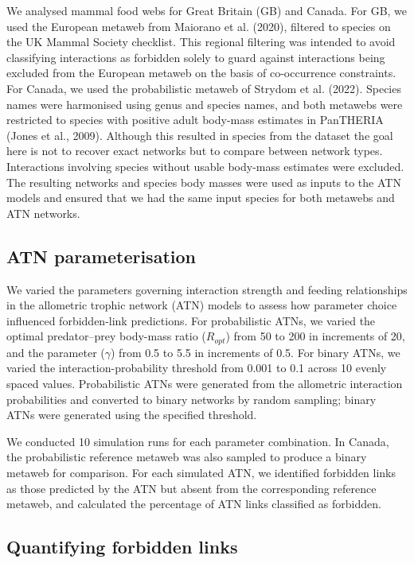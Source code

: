 \documentclass[
]{article}
\begin{document}
We analysed mammal food webs for Great Britain (GB) and Canada. For GB,
we used the European metaweb from Maiorano et al. (2020), filtered to
species on the UK Mammal Society checklist. This regional filtering was
intended to avoid classifying interactions as forbidden solely to guard
against interactions being excluded from the European metaweb on the
basis of co-occurrence constraints. For Canada, we used the
probabilistic metaweb of Strydom et al. (2022). Species names were
harmonised using genus and species names, and both metawebs were
restricted to species with positive adult body-mass estimates in
PanTHERIA (Jones et al., 2009). Although this resulted in species from
the dataset the goal here is not to recover exact networks but to
compare between network types. Interactions involving species without
usable body-mass estimates were excluded. The resulting networks and
species body masses were used as inputs to the ATN models and ensured
that we had the same input species for both metawebs and ATN networks.

\subsection{ATN parameterisation}\label{atn-parameterisation}

We varied the parameters governing interaction strength and feeding
relationships in the allometric trophic network (ATN) models to assess
how parameter choice influenced forbidden-link predictions. For
probabilistic ATNs, we varied the optimal predator--prey body-mass ratio
(\(R_{opt}\)) from 50 to 200 in increments of 20, and the parameter
(\(\gamma\)) from 0.5 to 5.5 in increments of 0.5. For binary ATNs, we
varied the interaction-probability threshold from 0.001 to 0.1 across 10
evenly spaced values. Probabilistic ATNs were generated from the
allometric interaction probabilities and converted to binary networks by
random sampling; binary ATNs were generated using the specified
threshold.

We conducted 10 simulation runs for each parameter combination. In
Canada, the probabilistic reference metaweb was also sampled to produce
a binary metaweb for comparison. For each simulated ATN, we identified
forbidden links as those predicted by the ATN but absent from the
corresponding reference metaweb, and calculated the percentage of ATN
links classified as forbidden.

\subsection{Quantifying forbidden
links}\label{quantifying-forbidden-links}
\end{document}

